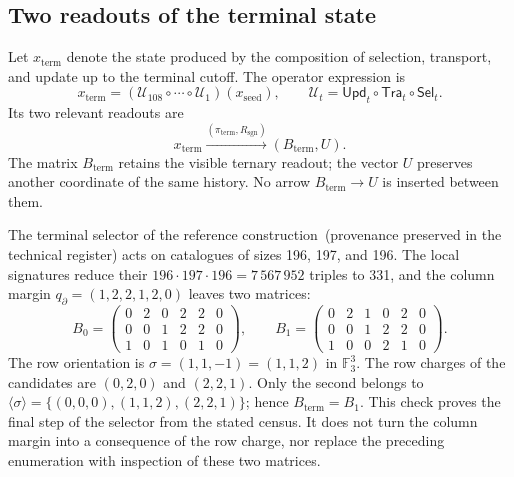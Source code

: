 \subsection{Two readouts of the terminal state}
\label{subsec:k-terminal}

Let \(x_{\mathrm{term}}\) denote the state produced by the composition
of selection, transport, and update up to the terminal cutoff. The
operator expression is
\[
 x_{\mathrm{term}}=
 (\mathcal U_{108}\circ\cdots\circ\mathcal U_1)(x_{\mathrm{seed}}),
 \qquad \mathcal U_t=\mathsf{Upd}_t\circ\mathsf{Tra}_t\circ\mathsf{Sel}_t.
\]
Its two relevant readouts are
\[
 x_{\mathrm{term}}
 \xrightarrow{(\pi_{\mathrm{term}},R_{\mathrm{sgn}})}
 (B_{\mathrm{term}},U).
\]
The matrix \(B_{\mathrm{term}}\) retains the visible ternary readout; the
vector \(U\) preserves another coordinate of the same history. No arrow
\(B_{\mathrm{term}}\to U\) is inserted between them.

The terminal selector of the reference construction~\textup{(provenance preserved in the technical register)} acts on catalogues
of sizes 196, 197, and 196. The local signatures reduce their
\(196\cdot197\cdot196=7\,567\,952\) triples to 331, and the column
margin \(q_{\partial}=(1,2,2,1,2,0)\) leaves two matrices:
\[
 B_0=\begin{pmatrix}0&2&0&2&2&0\\0&0&1&2&2&0\\1&0&1&0&1&0\end{pmatrix},
 \qquad
 B_1=\begin{pmatrix}0&2&1&0&2&0\\0&0&1&2&2&0\\1&0&0&2&1&0\end{pmatrix}.
\]
The row orientation is \(\sigma=(1,1,-1)=(1,1,2)\) in
\(\mathbb F_3^3\). The row charges of the candidates are
\((0,2,0)\) and \((2,2,1)\). Only the second belongs to
\(\langle\sigma\rangle=\{(0,0,0),(1,1,2),(2,2,1)\}\); hence
\(B_{\mathrm{term}}=B_1\). This check proves the final step of the
selector from the stated census. It does not turn the column margin
into a consequence of the row charge, nor replace the preceding enumeration
with inspection of these two matrices.

